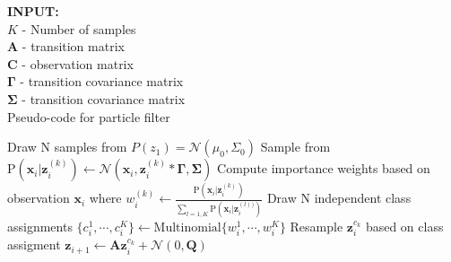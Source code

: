 \documentclass[12pt]{article}
\newcommand{\p}[1]{\mathrm{P}\left(#1 \right)}
\newcommand{\matr}[1]{\bm{#1}}     %
\newcommand{\vect}[1]{\mathbf{#1}}
\begin{document}
\begin{algorithm}[H]
\textbf{INPUT:} \\
	$K$ - Number of samples \\
	$\matr{A}$ - transition matrix\\
	$\matr{C}$ - observation matrix \\
	$\matr{\Gamma}$ - transition covariance matrix \\
	$\matr{\Sigma}$ - transition covariance matrix \\
\caption{Pseudo-code for particle filter}
	\begin{algorithmic}
		\State Draw N samples from $P(z_1)=\mathcal{N}(\mu_0, \Sigma_0)$
			\State Sample from $\p{ \vect{x}_i | \vect{z}_i^{(k)}} \gets \mathcal{N} (\vect{x}_i, \vect{z}_i^{(k)} * \matr{\Gamma},\matr{\Sigma}) $ 
		 	\State Compute importance weights based on observation $\vect{x}_i$ where
			$w_i^{(k)} \gets \frac{ \p{ \vect{x}_i | \vect{z}_i^{(k)}} } {\sum_{l=1,K} \p{\vect{x}_i | \vect{z}_i^{(l))} }}$
			\State Draw N independent class assignments $ \{c_i^1 ,\cdots, c_i^K\} \gets \text{Multinomial} \{w_i^1 ,\cdots, w_i^K\}$
			\State Resample $\vect{z}_{i}^{c_k}$ based on class assigment
			\State $\vect{z}_{i+1} \gets  \matr{A} \vect{z}_{i}^{c_k} + \mathcal{N} (0 , \matr{Q} )$
		\EndFor
	\end{algorithmic}
\end{algorithm}
\end{document}
